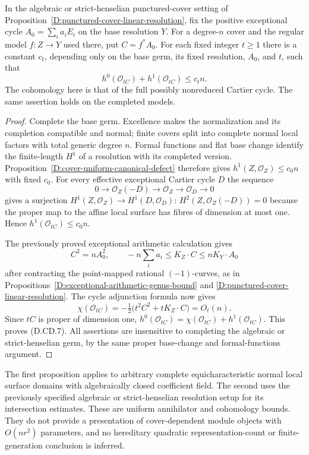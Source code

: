 \begin{corollary}
\label{D:cover-thickening-linear-cohomology}
In the algebraic or strict-henselian punctured-cover setting of
Proposition~\ref{D:punctured-cover-linear-resolution}, fix the positive
exceptional cycle $A_0=\sum_i a_iE_i$ on the base resolution $Y$.
For a degree-$n$ cover and the regular model $f:Z\to Y$ used there, put
$C=f^*A_0$. For each fixed integer $t\ge1$ there is a constant $c_t$,
depending only on the base germ, its fixed resolution, $A_0$, and $t$,
such that
\[
 h^0(\mathcal O_{tC})+h^1(\mathcal O_{tC})\le c_t n.
                                                               \tag{D.CD.7}
\]
The cohomology here is that of the full possibly nonreduced Cartier
cycle. The same assertion holds on the completed models.
\end{corollary}
\begin{proof}
Complete the base germ. Excellence makes the normalization and its
completion compatible and normal; finite covers split into complete
normal local factors with total generic degree $n$. Formal functions
and flat base change identify the finite-length $H^1$ of a resolution
with its completed version. Proposition~\ref{D:cover-uniform-canonical-defect}
therefore gives $h^1(Z,\mathcal O_Z)\le c_0 n$ with fixed $c_0$.
For every effective exceptional Cartier cycle $D$ the sequence
\[
 0\longrightarrow\mathcal O_Z(-D)\longrightarrow\mathcal O_Z
 \longrightarrow\mathcal O_D\longrightarrow0
\]
gives a surjection $H^1(Z,\mathcal O_Z)\to H^1(D,\mathcal O_D)$:
$H^2(Z,\mathcal O_Z(-D))=0$ because the proper map to the affine
local surface has fibres of dimension at most one. Hence
$h^1(\mathcal O_{tC})\le c_0n$.

The previously proved exceptional arithmetic calculation gives
\[
 C^2=nA_0^2,\qquad
 -n\sum_i a_i\le K_Z\cdot C\le nK_Y\cdot A_0
\]
after contracting the point-mapped rational $(-1)$-curves, as in
Propositions~\ref{D:exceptional-arithmetic-genus-bound} and
\ref{D:punctured-cover-linear-resolution}. The cycle adjunction formula
now gives
\[
 \chi(\mathcal O_{tC})
 =-\tfrac12\bigl(t^2C^2+tK_Z\cdot C\bigr)=O_t(n).
\]
Since $tC$ is proper of dimension one,
$h^0(\mathcal O_{tC})=\chi(\mathcal O_{tC})+h^1(\mathcal O_{tC})$.
This proves (D.CD.7). All assertions are insensitive to completing the
algebraic or strict-henselian germ, by the same proper base-change and
formal-functions argument.
\end{proof}

\begin{remark}
The first proposition applies to arbitrary complete equicharacteristic
normal local surface domains with algebraically closed coefficient field.
The second uses the previously specified algebraic or strict-henselian
resolution setup for its intersection estimates. These are uniform
annihilator and cohomology bounds. They do not provide a presentation of
cover-dependent module objects with $O(nr^2)$ parameters, and no hereditary
quadratic representation-count or finite-generation conclusion is inferred.
\end{remark}
